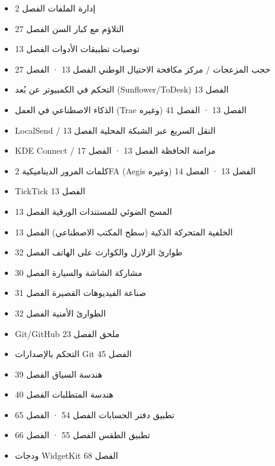 
\begin{itemize}
  \item إدارة الملفات الفصل 2
  \item التلاؤم مع كبار السن الفصل 27
  \item توصيات تطبيقات الأدوات الفصل 13
  \item حجب المزعجات / مركز مكافحة الاحتيال الوطني الفصل 13 · الفصل 27
  \item التحكم في الكمبيوتر عن بُعد (Sunflower/ToDesk) الفصل 13
  \item الذكاء الاصطناعي في العمل (Trae وغيره) الفصل 13 · الفصل 41
  \item LocalSend / النقل السريع عبر الشبكة المحلية الفصل 13
  \item KDE Connect / مزامنة الحافظة الفصل 13 · الفصل 17
  \item كلمات المرور الديناميكية 2FA (Aegis وغيره) الفصل 13 · الفصل 14
  \item TickTick الفصل 13
  \item المسح الضوئي للمستندات الورقية الفصل 13
  \item الخلفية المتحركة الذكية (سطح المكتب الاصطناعي) الفصل 13
  \item طوارئ الزلازل والكوارث على الهاتف الفصل 32
  \item مشاركة الشاشة والسيارة الفصل 30
  \item صناعة الفيديوهات القصيرة الفصل 31
  \item الطوارئ الأمنية الفصل 32
  \item Git/GitHub ملحق الفصل 23
  \item التحكم بالإصدارات Git الفصل 45
  \item هندسة السياق الفصل 39
  \item هندسة المتطلبات الفصل 40
  \item تطبيق دفتر الحسابات الفصل 54 · الفصل 65
  \item تطبيق الطقس الفصل 55 · الفصل 66
  \item ودجات WidgetKit الفصل 68
\end{itemize}
